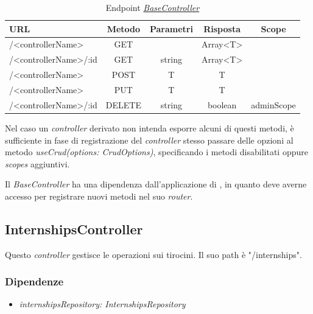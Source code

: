 \begin{table}[h]
    \ttfamily
    \caption{Endpoint \hyperref[server:base-controller]{\textit{BaseController}}}
    \centering
    \label{table:endpoints}
    \begin{tabular}{l c c c c}    
    URL  & Metodo & Parametri  & Risposta & Scope \\ 
	    \midrule
	    /<controllerName> & GET &  & Array<T>   \\
	    /<controllerName>/:id & GET & string & Array<T>   \\
	    /<controllerName> & POST & T & T  \\
	    /<controllerName> & PUT & T & T  \\
	    /<controllerName>/:id & DELETE & string & boolean  & adminScope \\
	    \bottomrule
    \end{tabular}
\end{table}

\noindent
Nel caso un \textit{controller} derivato non intenda esporre alcuni di questi metodi, è sufficiente in fase di registrazione del \textit{controller} stesso passare delle opzioni al metodo \textit{useCrud(options: CrudOptions)}, specificando i metodi disabilitati oppure \textit{scopes} aggiuntivi.

Il \textit{BaseController} ha una dipendenza dall'applicazione di \expressjs, in quanto deve averne accesso per registrare nuovi metodi nel suo \textit{router}.

\subsection{InternshipsController}
Questo \textit{controller} gestisce le operazioni sui tirocini. Il suo path è "/internships".
\subsubsection{Dipendenze}
\begin{itemize}[itemsep=0pt]
	\item \textit{internshipsRepository: InternshipsRepository}
\end{itemize}
